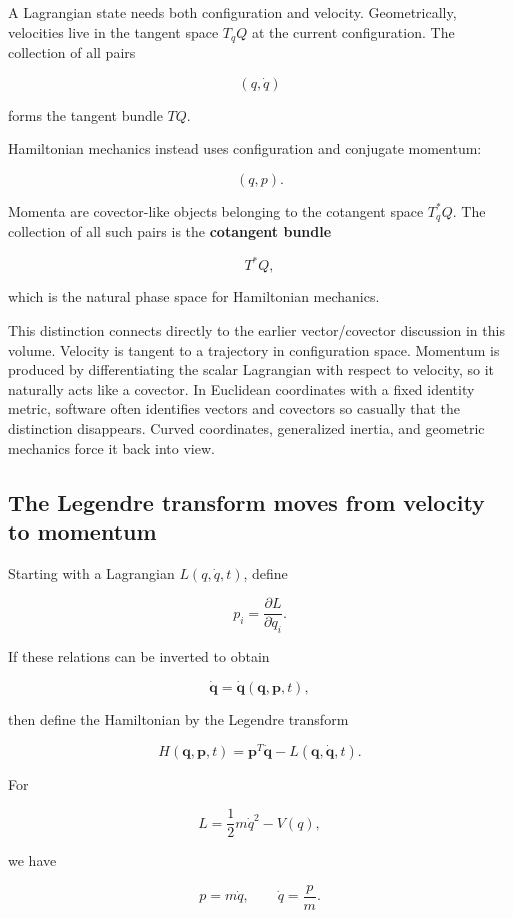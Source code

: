 A Lagrangian state needs both configuration and velocity. Geometrically, velocities live in the tangent space \(T_qQ\) at the current configuration. The collection of all pairs

\[
(q,\dot q)
\]

forms the tangent bundle \(TQ\).

Hamiltonian mechanics instead uses configuration and conjugate momentum:

\[
(q,p).
\]

Momenta are covector-like objects belonging to the cotangent space \(T_q^*Q\). The collection of all such pairs is the \textbf{cotangent bundle}

\[
\boxed{T^*Q,}
\]

which is the natural phase space for Hamiltonian mechanics.

This distinction connects directly to the earlier vector/covector discussion in this volume. Velocity is tangent to a trajectory in configuration space. Momentum is produced by differentiating the scalar Lagrangian with respect to velocity, so it naturally acts like a covector. In Euclidean coordinates with a fixed identity metric, software often identifies vectors and covectors so casually that the distinction disappears. Curved coordinates, generalized inertia, and geometric mechanics force it back into view.

\subsection{The Legendre transform moves from velocity to momentum}\label{02-foundations-ii-ch025-the-legendre-transform-moves-from-velocity-to-momentum}

Starting with a Lagrangian \(L(q,\dot q,t)\), define

\[
p_i=\frac{\partial L}{\partial\dot q_i}.
\]

If these relations can be inverted to obtain

\[
\dot{\mathbf q}
=
\dot{\mathbf q}(\mathbf q,\mathbf p,t),
\]

then define the Hamiltonian by the Legendre transform

\[
\boxed{
H(\mathbf q,\mathbf p,t)
=
\mathbf p^T\dot{\mathbf q}
-
L(\mathbf q,\dot{\mathbf q},t)
}.
\]

For

\[
L=\frac12m\dot q^2-V(q),
\]

we have

\[
p=m\dot q,
\qquad
\dot q=\frac pm.
\]

